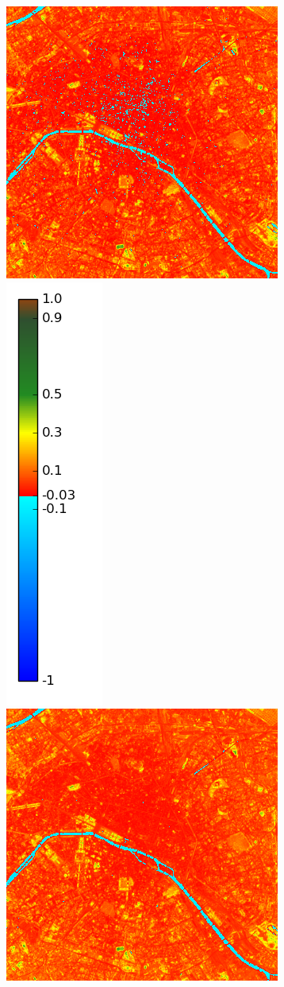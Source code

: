 \documentclass{book}
\begin{document}
\begin{figure}[H]
\centerline{
\includegraphics[scale=0.25]{images/Paris/03_ndvi.png}
\includegraphics[scale=0.2]{images/colormap.png}
\includegraphics[scale=0.25]{images/Paris/04_ndvi.png}
}
\end{figure}
\end{document}

